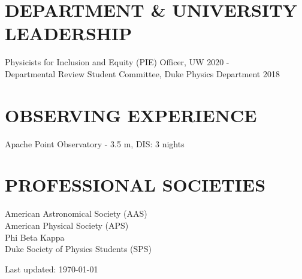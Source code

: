 \documentclass[margin]{res}
\begin{document}
\begin{resume}
\section{\normalfont DEPARTMENT \& UNIVERSITY LEADERSHIP}

Physicists for Inclusion and Equity (PIE) Officer, UW \hfill 2020 - \\
Departmental Review Student Committee, Duke Physics Department \hfill 2018 \\

\section{\normalfont OBSERVING EXPERIENCE}

Apache Point Observatory - 3.5 m, DIS: 3 nights \\

\section{\normalfont PROFESSIONAL SOCIETIES}

American Astronomical Society (AAS) \\
American Physical Society (APS) \\
Phi Beta Kappa \\
Duke Society of Physics Students (SPS) \\


\vfill
\strut \hfill
Last updated: \today

\end{resume}
\(\)
\end{document}
